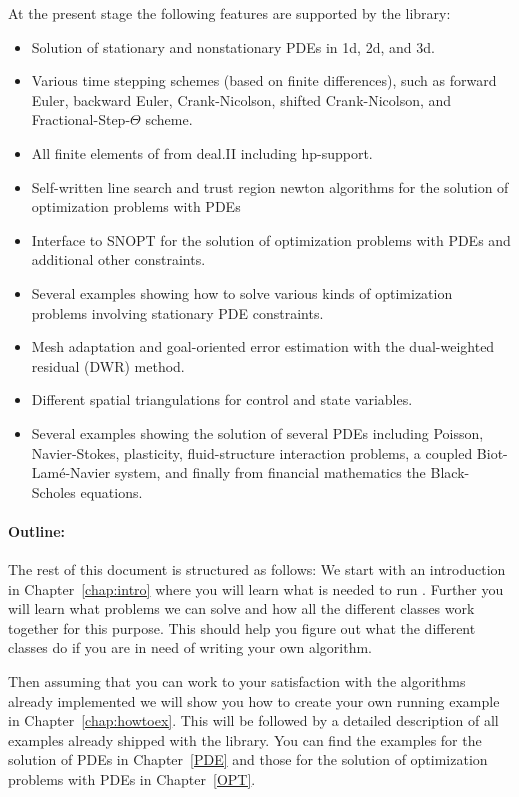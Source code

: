 At the present stage the following features are supported by the library:
\begin{itemize}
\item Solution of stationary and nonstationary PDEs in 1d, 2d, and 3d.
\item Various time stepping schemes (based on finite differences), 
  such as forward Euler, backward Euler,
  Crank-Nicolson, shifted Crank-Nicolson, and Fractional-Step-$\Theta$ scheme.
\item All finite elements of from deal.II including hp-support.
\item Self-written line search and trust region newton algorithms for the 
   solution of optimization problems with PDEs \cite{NoWr00}
\item Interface to SNOPT for the solution of optimization problems with PDEs and
  additional other constraints.
\item Several examples showing how to solve various kinds of optimization problems
  involving stationary PDE constraints.
\item Mesh adaptation and goal-oriented error estimation with
the dual-weighted residual (DWR) method.
\item Different spatial triangulations for control and state variables.
\item Several examples showing the solution of several PDEs including
   Poisson, Navier-Stokes, plasticity, fluid-structure interaction problems,
a coupled Biot-Lam\'e-Navier system, and finally from financial mathematics
the Black-Scholes equations.
\end{itemize}


\paragraph{Outline:} 
The rest of this document is structured as follows: We start with an introduction in
Chapter~\ref{chap:intro} where you will learn what is needed to run \dope{}. 
Further you will learn what problems we can solve and how all the different classes 
work together for this purpose. This should help you figure out what the different classes
do if you are in need of writing your own algorithm.

Then assuming that you can work to your satisfaction with the algorithms already implemented
we will show you how to create your own running example in Chapter~\ref{chap:howtoex}.
This will be followed by a detailed description of all examples already shipped with 
the library. You can find the examples for the solution of PDEs in Chapter~\ref{PDE}
and those for the solution of optimization problems with PDEs in Chapter~\ref{OPT}.

